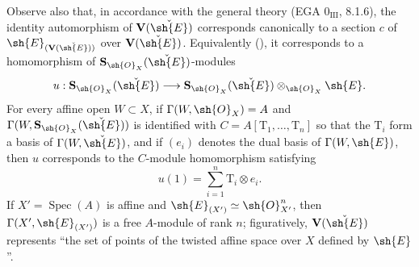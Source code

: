 \begin{env}[18.5.1]
Observe also that, in accordance with the general theory (EGA $0_{\mathrm{III}}$, 8.1.6), the identity automorphism of $\mathbf{V}(\check{\sh{E}})$ corresponds canonically to a section $c$ of $\sh{E}_{(\mathbf{V}(\check{\sh{E}}))}$ over $\mathbf{V}(\check{\sh{E}})$.
Equivalently (), it corresponds to a homomorphism of $\mathbf{S}_{\sh{O}_X}(\check{\sh{E}})$-modules
\[
u:\mathbf{S}_{\sh{O}_X}(\check{\sh{E}})\longrightarrow
\mathbf{S}_{\sh{O}_X}(\check{\sh{E}})\otimes_{\sh{O}_X}\sh{E}.
\]
For every affine open $W\subset X$, if $\Gamma(W,\sh{O}_X)=A$ and $\Gamma(W,\mathbf{S}_{\sh{O}_X}(\check{\sh{E}}))$ is identified with $C=A[\mathrm{T}_1,\ldots,\mathrm{T}_n]$ so that the $\mathrm{T}_i$ form a basis of $\Gamma(W,\check{\sh{E}})$, and if $(e_i)$ denotes the dual basis of $\Gamma(W,\sh{E})$, then $u$ corresponds to the $C$-module homomorphism satisfying
\[
u(1)=\sum_{i=1}^n \mathrm{T}_i\otimes e_i.
\]
If $X'=\operatorname{Spec}(A)$ is affine and $\sh{E}_{(X')}\simeq\sh{O}_{X'}^n$, then $\Gamma(X',\sh{E}_{(X')})$ is a free $A$-module of rank $n$; figuratively, $\mathbf{V}(\check{\sh{E}})$ represents ``the set of points of the twisted affine space over $X$ defined by $\sh{E}$''.
\end{env}

